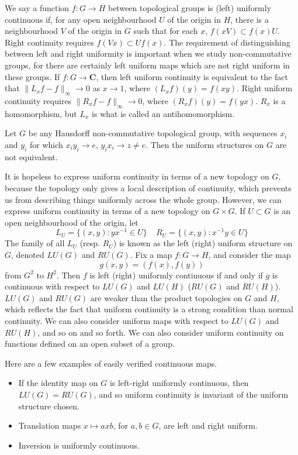 We say a function $f: G \to H$ between topological groups is (left) uniformly continuous if, for any open neighbourhood $U$ of the origin in $H$, there is a neighbourhood $V$ of the origin in $G$ such that for each $x$, $f(xV) \subset f(x) U$. Right continuity requires $f(Vx) \subset U f(x)$. The requirement of distinguishing between left and right uniformity is important when we study non-commutative groups, for there are certainly left uniform maps which are not right uniform in these groups. If $f: G \to \mathbf{C}$, then left uniform continuity is equivalent to the fact that $\| L_x f - f \|_\infty \to 0$ as $x \to 1$, where $(L_x f)(y) = f(xy)$. Right uniform continuity requires $\| R_x f - f \|_\infty \to 0$, where $(R_x f)(y) = f(yx)$. $R_x$ is a homomorphism, but $L_x$ is what is called an antihomomorphism.

\begin{example}
    Let $G$ be any Hausdorff non-commutative topological group, with sequences $x_i$ and $y_i$ for which $x_i y_i \to e$, $y_i x_i \to z \neq e$. Then the uniform structures on $G$ are not equivalent.
\end{example}

It is hopeless to express uniform continuity in terms of a new topology on $G$, because the topology only gives a local description of continuity, which prevents us from describing things uniformly across the whole group. However, we can express uniform continuity in terms of a new topology on $G \times G$. If $U \subset G$ is an open neighbourhood of the origin, let
%
\[ L_U = \{ (x,y): yx^{-1} \in U \}\ \ \ \ \ R_U = \{ (x,y): x^{-1}y \in U \} \]
%
The family of all $L_U$ (resp. $R_U$) is known as the left (right) uniform structure on $G$, denoted $LU(G)$ and $RU(G)$. Fix a map $f: G \to H$, and consider the map
%
\[ g(x,y) = (f(x), f(y)) \]
%
from $G^2$ to $H^2$. Then $f$ is left (right) uniformly continuous if and only if $g$ is continuous with respect to $LU(G)$ and $LU(H)$ ($RU(G)$ and $RU(H)$). $LU(G)$ and $RU(G)$ are weaker than the product topologies on $G$ and $H$, which reflects the fact that uniform continuity is a strong condition than normal continuity. We can also consider uniform maps with respect to $LU(G)$ and $RU(H)$, and so on and so forth. We can also consider uniform continuity on functions defined on an open subset of a group.

\begin{example}
    Here are a few examples of easily verified continuous maps.
    \begin{itemize}
        \item If the identity map on $G$ is left-right uniformly continuous, then $LU(G) = RU(G)$, and so uniform continuity is invariant of the uniform structure chosen.
        \item Translation maps $x \mapsto axb$, for $a,b \in G$, are left and right uniform.
        \item Inversion is uniformly continuous.
    \end{itemize}
\end{example}

